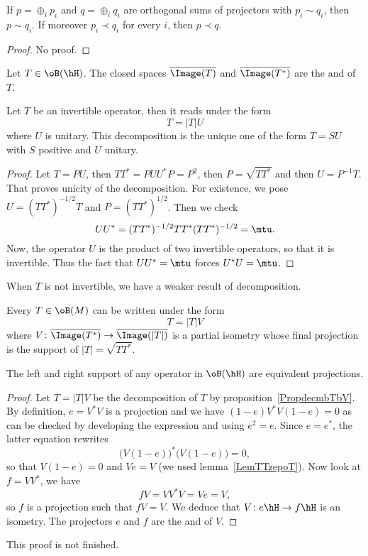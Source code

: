 \begin{proposition}
	If $p=\oplus_i p_i$ and $q=\oplus_iq_i$ are orthogonal sums of projectors with $p_i\sim q_i$, then $p\sim q_i$. If moreover $p_i\prec q_i$ for every $i$, then $p\prec q$.
\end{proposition}
\begin{proof}
	No proof.
\end{proof}

Let $T\in\oB(\hH)$. The closed spaces $\overline{ \Image(T) }$ and $\overline{ \Image(T^*) }$ are the  and  of $T$.

\begin{theorem}
	Let $T$ be an invertible operator, then it reads under the form
	\[
		T=| T |U
	\]
	where $U$ is unitary. This decomposition is the unique one of the form $T=SU$ with $S$ positive and $U$ unitary.
\end{theorem}

\begin{proof}
	Let $T=PU$, then $TT^*=PUU^*P=P^2$, then $P=\sqrt{TT^*}$ and then $U=P^{-1}T$. That proves unicity of the decomposition. For existence, we pose $U=(TT^*)^{-1/2}T$ and $P=(TT^*)^{1/2}$. Then we check
	\begin{equation}
		UU^*=(TT^*)^{-1/2}TT^*(TT^*)^{-1/2}=\mtu.
	\end{equation}
	Now, the operator $U$ is the product of two invertible operators, so that it is invertible. Thus the fact that $UU^*=\mtu$ forces $U^*U=\mtu$.
\end{proof}

When $T$ is not invertible, we have a weaker result of decomposition.
\begin{proposition}		\label{PropdecmbTbV}
	Every $T\in\oB(M)$ can be written under the form
	\[
		T=| T |V
	\]
	where $V\colon \overline{ \Image(T^*) }\to \overline{ \Image(| T |) }$ is a partial isometry whose final projection is the support of $| T |=\sqrt{TT^*}$.
\end{proposition}

\begin{proposition}
	The left and right support of any operator in $\oB(\hH)$ are equivalent projections.
\end{proposition}

\begin{proof}
	Let $T=| T |V$ be the decomposition of $T$ by proposition~\ref{PropdecmbTbV}. By definition, $e=V^*V$ is a projection and we have $(1-e)V^*V(1-e)=0$ as can be checked by developing the expression and using $e^2=e$. Since $e=e^*$, the latter equation rewrites
	\[
		\big( V(1-e) \big)^*\big( V(1-e) \big)=0,
	\]
	so that $V(1-e)=0$ and $Ve=V$ (we used lemma~\ref{LemTTzepoT}). Now look at $f=VV^*$, we have
	\[
		fV=VV^*V=Ve=V,
	\]
	so $f$ is a projection such that $fV=V$. We deduce that $V\colon e\hH\to f\hH$ is an isometry. The projectors $e$ and $f$ are the  and   of $V$.
\end{proof}
\begin{probleme}
	This proof is not finished.
\end{probleme}

